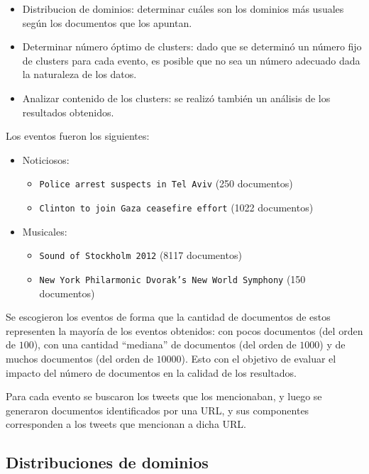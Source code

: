 \begin{itemize}
\item Distribucion de dominios: determinar cuáles son los dominios más
    usuales según los documentos que los apuntan.
\item Determinar número óptimo de clusters: dado que se determinó un
    número fijo de clusters para cada evento, es posible que no sea un
    número adecuado dada la naturaleza de los datos.
\item Analizar contenido de los clusters: se realizó también un análisis
    de los resultados obtenidos.
\end{itemize}

  Los eventos fueron los siguientes:

\begin{itemize}

\item Noticiosos:

\begin{itemize}
\item \texttt{Police arrest suspects in Tel Aviv} (250 documentos)
\item \texttt{Clinton to join Gaza ceasefire effort} (1022 documentos)
\end{itemize}

\item Musicales:

\begin{itemize}
\item \texttt{Sound of Stockholm 2012} (8117 documentos)
\item \texttt{New York Philarmonic Dvorak's New World Symphony} (150
      documentos)
\end{itemize}

\end{itemize}

  Se escogieron los eventos de forma que la cantidad de documentos de estos
  representen la mayoría de los eventos obtenidos: con pocos documentos (del orden
  de $100$), con una cantidad ``mediana'' de documentos (del orden de $1000$) y de 
  muchos documentos (del orden de $10000$). Esto con el objetivo de evaluar el impacto
  del número de documentos en la calidad de los resultados.

  Para cada evento se buscaron los tweets que los mencionaban, y luego se generaron documentos
  identificados por una URL, y sus componentes corresponden a los tweets que mencionan a dicha URL.

\subsection{Distribuciones de dominios}
\label{sec-4.4.1}


